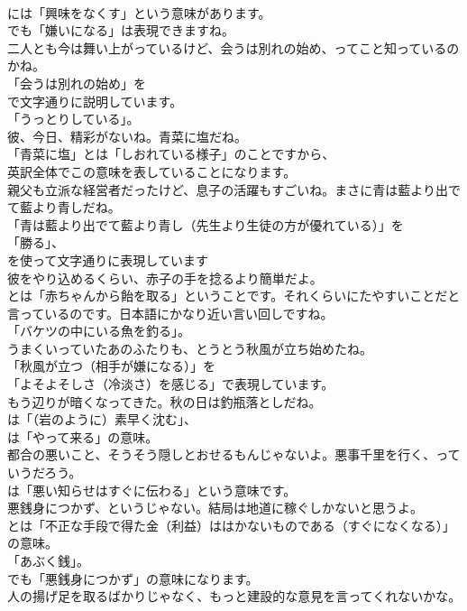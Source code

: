 \documentclass[8pt]{extreport}
\begin{document}
\begin{CJK}{UTF8}{min}
\\	には「興味をなくす」という意味があります。
\\	でも「嫌いになる」は表現できますね。	
\\	二人とも今は舞い上がっているけど、会うは別れの始め、ってこと知っているのかね。 
\\	「会うは別れの始め」を
\\	で文字通りに説明しています。
\\	「うっとりしている」。	
\\	彼、今日、精彩がないね。青菜に塩だね。 
\\	「青菜に塩」とは「しおれている様子」のことですから、
\\	英訳全体でこの意味を表していることになります。	
\\	親父も立派な経営者だったけど、息子の活躍もすごいね。まさに青は藍より出でて藍より青しだね。 
\\	「青は藍より出でて藍より青し（先生より生徒の方が優れている）」を
\\	「勝る」、
\\	を使って文字通りに表現しています	
\\	彼をやり込めるくらい、赤子の手を捻るより簡単だよ。 
\\	とは「赤ちゃんから飴を取る」ということです。それくらいにたやすいことだと言っているのです。日本語にかなり近い言い回しですね。
\\	「バケツの中にいる魚を釣る」。	
\\	うまくいっていたあのふたりも、とうとう秋風が立ち始めたね。 
\\	「秋風が立つ（相手が嫌になる）」を
\\	「よそよそしさ（冷淡さ）を感じる」で表現しています。	
\\	もう辺りが暗くなってきた。秋の日は釣瓶落としだね。 
\\	は「（岩のように）素早く沈む」、
\\	は「やって来る」の意味。	
\\	都合の悪いこと、そうそう隠しとおせるもんじゃないよ。悪事千里を行く、っていうだろう。 
\\	は「悪い知らせはすぐに伝わる」という意味です。	
\\	悪銭身につかず、というじゃない。結局は地道に稼ぐしかないと思うよ。 
\\	とは「不正な手段で得た金（利益）ははかないものである（すぐになくなる）」の意味。
\\	「あぶく銭」。
\\	でも「悪銭身につかず」の意味になります。	
\\	人の揚げ足を取るばかりじゃなく、もっと建設的な意見を言ってくれないかな。 

\end{CJK}
\end{document}
